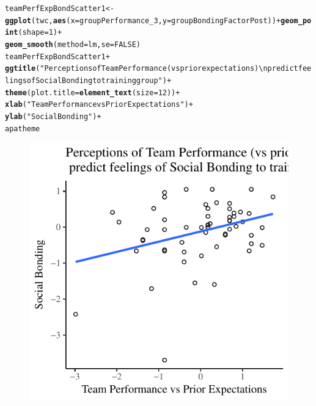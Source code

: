 \documentclass[english]{article}\usepackage[]{graphicx}\usepackage[]{color}
\makeatletter
\def\maxwidth{ %
  \ifdim\Gin@nat@width>\linewidth
    \linewidth
  \else
    \Gin@nat@width
  \fi
}
\newcommand{\hlnum}[1]{\textcolor[rgb]{0.686,0.059,0.569}{#1}}%
\newcommand{\hlstr}[1]{\textcolor[rgb]{0.192,0.494,0.8}{#1}}%
\newcommand{\hlopt}[1]{\textcolor[rgb]{0,0,0}{#1}}%
\newcommand{\hlstd}[1]{\textcolor[rgb]{0.345,0.345,0.345}{#1}}%
\newcommand{\hlkwb}[1]{\textcolor[rgb]{0.69,0.353,0.396}{#1}}%
\newcommand{\hlkwc}[1]{\textcolor[rgb]{0.333,0.667,0.333}{#1}}%
\newcommand{\hlkwd}[1]{\textcolor[rgb]{0.737,0.353,0.396}{\textbf{#1}}}%
\newenvironment{kframe}{%
 \def\at@end@of@kframe{}%
 \ifinner\ifhmode%
  \def\at@end@of@kframe{\end{minipage}}%
  \begin{minipage}{\columnwidth}%
 \fi\fi%
 \def\FrameCommand##1{\hskip\@totalleftmargin \hskip-\fboxsep
 \colorbox{shadecolor}{##1}\hskip-\fboxsep
     \hskip-\linewidth \hskip-\@totalleftmargin \hskip\columnwidth}%
 \MakeFramed {\advance\hsize-\width
   \@totalleftmargin\z@ \linewidth\hsize
   \@setminipage}}%
 {\par\unskip\endMakeFramed%
 \at@end@of@kframe}
\newenvironment{knitrout}{}{} %
\makeatother
\begin{document}
\begin{knitrout}
\color{fgcolor}\begin{kframe}
\begin{alltt}
\hlstd{teamPerfExpBondScatter1} \hlkwb{<-} \hlkwd{ggplot}\hlstd{(twc,} \hlkwd{aes}\hlstd{(}\hlkwc{x}\hlstd{=groupPerformance_3,} \hlkwc{y}\hlstd{=groupBondingFactorPost))} \hlopt{+} \hlkwd{geom_point}\hlstd{(}\hlkwc{shape} \hlstd{=} \hlnum{1}\hlstd{)} \hlopt{+}
                            \hlkwd{geom_smooth}\hlstd{(}\hlkwc{method}\hlstd{=lm,} \hlkwc{se}\hlstd{=}\hlnum{FALSE}\hlstd{)}
\hlstd{teamPerfExpBondScatter1} \hlopt{+}
            \hlkwd{ggtitle}\hlstd{(}\hlstr{"Perceptions of Team Performance (vs prior expectations) \textbackslash{}n predict feelings of Social Bonding to training group"}\hlstd{)} \hlopt{+}
            \hlkwd{theme}\hlstd{(}\hlkwc{plot.title} \hlstd{=} \hlkwd{element_text}\hlstd{(}\hlkwc{size}\hlstd{=}\hlnum{12}\hlstd{))} \hlopt{+}
            \hlkwd{xlab}\hlstd{(}\hlstr{"Team Performance vs Prior Expectations"}\hlstd{)} \hlopt{+}
            \hlkwd{ylab}\hlstd{(}\hlstr{"Social Bonding"}\hlstd{)} \hlopt{+}
            \hlstd{apatheme}
\end{alltt}


{\ttfamily\noindent\color{warningcolor}{\#\# Warning: Removed 1 rows containing non-finite values (stat\_smooth).}}

{\ttfamily\noindent\color{warningcolor}{\#\# Warning: Removed 1 rows containing missing values (geom\_point).}}\end{kframe}\begin{figure}

{\centering \includegraphics[width=\maxwidth]{figure/teamPerfExpBondScatter1-1} 

}

\end{figure}


\end{knitrout}
\end{document}
